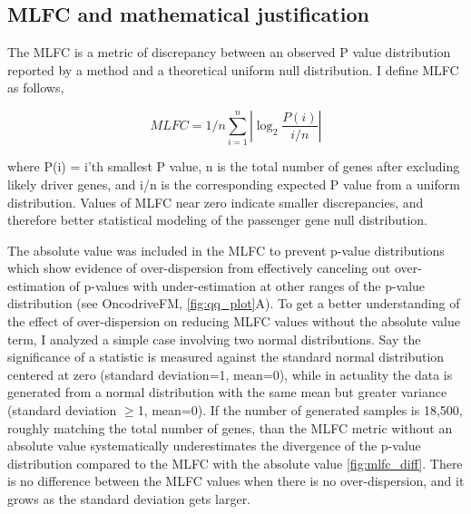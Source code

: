 \subsection{MLFC and mathematical justification}
\label{sec:mlfc_justification}

The MLFC is a metric of discrepancy between an observed P value distribution reported by a method and a theoretical uniform null distribution. I define MLFC as follows,

\begin{equation}
MLFC=1/n\sum_{i=1}^{n}{\left|\log_2{\frac{P(i)}{i/n}}\right|}
\end{equation}

where P(i) = i'th smallest P value, n is the total number of genes after excluding likely driver genes, and i/n is the corresponding expected P value from a uniform distribution. Values of MLFC near zero indicate smaller discrepancies, and therefore better statistical modeling of the passenger gene null distribution. 

The absolute value was included in the MLFC to prevent p-value distributions which show evidence of over-dispersion from effectively canceling out over-estimation of p-values with under-estimation at other ranges of the p-value distribution (see OncodriveFM, \autoref{fig:qq_plot}A). To get a better understanding of the effect of over-dispersion on reducing MLFC values without the absolute value term, I analyzed a simple case involving two normal distributions. Say the significance of a statistic is measured against the standard normal distribution centered at zero (standard deviation=1, mean=0), while in actuality the data is generated from a normal distribution with the same mean but greater variance (standard deviation $\geq$1, mean=0). If the number of generated samples is 18,500, roughly matching the total number of genes, than the MLFC metric without an absolute value systematically underestimates the divergence of the p-value distribution compared to the MLFC with the absolute value \autoref{fig:mlfc_diff}. There is no difference between the MLFC values when there is no over-dispersion, and it grows as the standard deviation gets larger.

